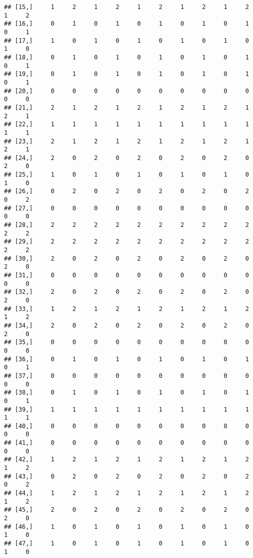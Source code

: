 \documentclass[
]{article}
\begin{document}
\begin{verbatim}
## [15,]     1     2     1     2     1     2     1     2     1     2     1     2
## [16,]     0     1     0     1     0     1     0     1     0     1     0     1
## [17,]     1     0     1     0     1     0     1     0     1     0     1     0
## [18,]     0     1     0     1     0     1     0     1     0     1     0     1
## [19,]     0     1     0     1     0     1     0     1     0     1     0     1
## [20,]     0     0     0     0     0     0     0     0     0     0     0     0
## [21,]     2     1     2     1     2     1     2     1     2     1     2     1
## [22,]     1     1     1     1     1     1     1     1     1     1     1     1
## [23,]     2     1     2     1     2     1     2     1     2     1     2     1
## [24,]     2     0     2     0     2     0     2     0     2     0     2     0
## [25,]     1     0     1     0     1     0     1     0     1     0     1     0
## [26,]     0     2     0     2     0     2     0     2     0     2     0     2
## [27,]     0     0     0     0     0     0     0     0     0     0     0     0
## [28,]     2     2     2     2     2     2     2     2     2     2     2     2
## [29,]     2     2     2     2     2     2     2     2     2     2     2     2
## [30,]     2     0     2     0     2     0     2     0     2     0     2     0
## [31,]     0     0     0     0     0     0     0     0     0     0     0     0
## [32,]     2     0     2     0     2     0     2     0     2     0     2     0
## [33,]     1     2     1     2     1     2     1     2     1     2     1     2
## [34,]     2     0     2     0     2     0     2     0     2     0     2     0
## [35,]     0     0     0     0     0     0     0     0     0     0     0     0
## [36,]     0     1     0     1     0     1     0     1     0     1     0     1
## [37,]     0     0     0     0     0     0     0     0     0     0     0     0
## [38,]     0     1     0     1     0     1     0     1     0     1     0     1
## [39,]     1     1     1     1     1     1     1     1     1     1     1     1
## [40,]     0     0     0     0     0     0     0     0     0     0     0     0
## [41,]     0     0     0     0     0     0     0     0     0     0     0     0
## [42,]     1     2     1     2     1     2     1     2     1     2     1     2
## [43,]     0     2     0     2     0     2     0     2     0     2     0     2
## [44,]     1     2     1     2     1     2     1     2     1     2     1     2
## [45,]     2     0     2     0     2     0     2     0     2     0     2     0
## [46,]     1     0     1     0     1     0     1     0     1     0     1     0
## [47,]     1     0     1     0     1     0     1     0     1     0     1     0

\end{verbatim}
\end{document}

